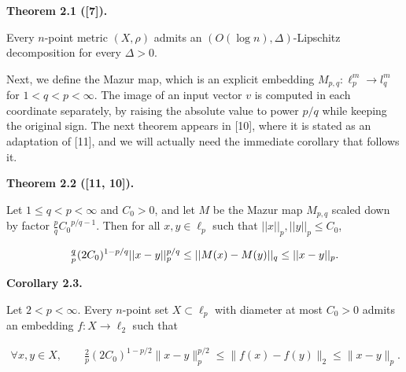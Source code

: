 \documentclass[10pt,a4paper]{amsart}
\begin{document}
\par\medskip\noindent\textbf{Theorem 2.1 ([7]).}\par
Every $n$-point metric $(X,\rho)$ admits an $\left(O\left(\log n\right),\Delta\right)$-Lipschitz decomposition for every $\Delta>0$.
\par
\par
\par
Next, we define the Mazur map, which is an explicit embedding $M_{p,q}:\ell_{p}^{m}\to l_{q}^{m}$ for $1<q<p<\infty$. The image of an input vector $v$ is computed in each coordinate separately, by raising the absolute value to power $p/q$ while keeping the original sign. The next theorem appears in [10], where it is stated as an adaptation of [11], and we will actually need the immediate corollary that follows it.
\par
\par
\par\medskip\noindent\textbf{Theorem 2.2 ([11, 10]).}\par
Let $1\leq{q}<p<\infty$ and $C_{0}>0$, and let $M$ be the Mazur map $M_{p,q}$ scaled down by factor $\frac{p}{q}{C_{0}}^{p/q-1}$. Then for all $x,y\in\ell_{p}$ such that $||x||_{p},||y||_{p}\leq C_{0}$,
\par
\[\begin{aligned}
\tfrac{q}{p}(2C_{0})^{1-p/q}||x-y||_{p}^{p/q}\leq||M(x)-M(y)||_{q}\leq||x-y||_%
{p}.
\end{aligned}\]
\par
\par
\par\medskip\noindent\textbf{Corollary 2.3.}\par
Let $2<p<\infty$. Every $n$-point set $X\subset\ell_{p}$ with diameter at most $C_{0}>0$ admits an embedding $f:X\to\ell_{2}$ such that
\par
\[\begin{aligned}
\forall x,y\in X,\qquad\tfrac{2}{p}(2C_{0})^{1-p/2}\|x-y\|_{p}^{p/2}\leq\|f(x)%
-f(y)\|_{2}\leq\|x-y\|_{p}.
\end{aligned}\]
\par
\par
\end{document}
